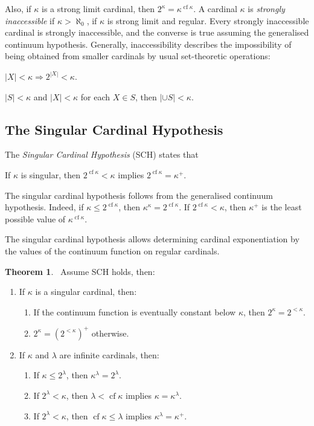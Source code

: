 \documentclass[8pt]{article}
\theoremstyle{definition}
\theoremstyle{definition}
\newtheorem{theorem}{Theorem}[section]
\theoremstyle{definition}
\theoremstyle{definition}
\theoremstyle{definition}
\theoremstyle{definition}
\theoremstyle{definition}
\theoremstyle{definition}
\theoremstyle{definition}
\theoremstyle{definition}
\theoremstyle{definition}
\theoremstyle{definition}
\theoremstyle{definition}
\theoremstyle{definition}
\theoremstyle{question}
\begin{document}
Also, if $\kappa$ is a strong limit cardinal, then $2^{\kappa} = \kappa^{\operatorname{cf} \kappa}$.
A cardinal $\kappa$ is \emph{strongly inaccessible} if $\kappa > \aleph_0$, if $\kappa$ is strong limit and regular.
Every strongly inaccessible cardinal is strongly inaccessible, and the converse is true assuming the generalised continuum hypothesis.
Generally, inaccessibility describes the impossibility of being obtained from smaller cardinals by usual set-theoretic operations:
\begin{center}
  $|X| < \kappa \Rightarrow 2^{|X|} < \kappa$.

  $|S| < \kappa$ and $|X| < \kappa$ for each $X \in S$, then $|\cup S| < \kappa$.
\end{center}

\subsection{The Singular Cardinal Hypothesis}

The \emph{Singular Cardinal Hypothesis} (SCH) states that
\begin{center}
  If $\kappa$ is singular, then $2^{\operatorname{cf} \kappa} < \kappa$ implies $2^{\operatorname{cf} \kappa} = \kappa^{+}$.
\end{center}
The singular cardinal hypothesis follows from the generalised continuum hypothesis. 
Indeed, if $\kappa \leq 2^{\operatorname{cf} \kappa}$, then $\kappa^{\kappa} = 2^{\operatorname{cf} \kappa}$.
If $2^{\operatorname{cf} \kappa} < \kappa$, then $\kappa^{+}$ is the least possible value of $\kappa^{\operatorname{cf} \kappa}$.

The singular cardinal hypothesis allows determining cardinal exponentiation by the values of
the continuum function on regular cardinals.

\begin{theorem}~\label{SCH:thm}
  Assume SCH holds, then:

  \begin{enumerate}
    \item If $\kappa$ is a singular cardinal, then:
    \begin{enumerate}
      \item If the continuum function is eventually constant below $\kappa$, then $2^{\kappa} = 2^{< \kappa}$.
      \item $2^{\kappa} = (2^{< \kappa})^+$ otherwise.
    \end{enumerate}
    \item If $\kappa$ and $\lambda$ are infinite cardinals, then:
    \begin{enumerate}
      \item If $\kappa \leq 2^{\lambda}$, then $\kappa^{\lambda} = 2^{\lambda}$.
      \item If $2^{\lambda} < \kappa$, then $\lambda < \operatorname{cf} \kappa$ implies $\kappa = \kappa^{\lambda}$.
      \item If $2^{\lambda} < \kappa$, then $\operatorname{cf} \kappa \leq \lambda$ implies $ \kappa^{\lambda} = \kappa^+$.
    \end{enumerate}
  \end{enumerate}
\end{theorem}
\end{document}
